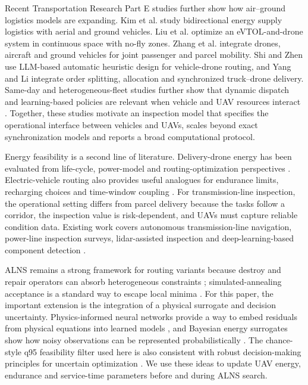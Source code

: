 \documentclass[preprint,12pt,number]{elsarticle}
\newcommand{\rev}[1]{{\color{blue}#1}}
\begin{document}
Recent Transportation Research Part E studies further show how air--ground logistics models are expanding. Kim et al. \cite{kim2026bidirectional} study bidirectional energy supply logistics with aerial and ground vehicles. Liu et al. \cite{liu2026evtol} optimize an eVTOL-and-drone system in continuous space with no-fly zones. Zhang et al. \cite{zhang2026airground} integrate drones, aircraft and ground vehicles for joint passenger and parcel mobility. Shi and Zhen \cite{shi2026llm} use LLM-based automatic heuristic design for vehicle-drone routing, and Yang and Li \cite{yang2025integrated} integrate order splitting, allocation and synchronized truck--drone delivery. Same-day and heterogeneous-fleet studies further show that dynamic dispatch and learning-based policies are relevant when vehicle and UAV resources interact \cite{ulmer2018sameday,chen2022deepq}. \rev{Together, these studies motivate an inspection model that specifies the operational interface between vehicles and UAVs, scales beyond exact synchronization models and reports a broad computational protocol.}

Energy feasibility is a second line of literature. Delivery-drone energy has been evaluated from life-cycle, power-model and routing-optimization perspectives \cite{stolaroff2018energy,zhang2021energyconsumption,aiello2021energy,chiang2019sustainability,cokyasar2023regional}. Electric-vehicle routing also provides useful analogues for endurance limits, recharging choices and time-window coupling \cite{schneider2014evrptw,desaulniers2016evrp}. For transmission-line inspection, the operational setting differs from parcel delivery because the tasks follow a corridor, the inspection value is risk-dependent, and UAVs must capture reliable condition data. Existing work covers autonomous transmission-line navigation, power-line inspection surveys, lidar-assisted inspection and deep-learning-based component detection \cite{hui2019monocular,ahmed2024powerline,li2021uavtransmission,nguyen2018visionreview,liu2021uavlidar,zhang2020visualinspection,li2025deeppowerline}.

ALNS remains a strong framework for routing variants because destroy and repair operators can absorb heterogeneous constraints \cite{ropke2006alns,sacramento2019alns}; simulated-annealing acceptance is a standard way to escape local minima \cite{kirkpatrick1983annealing}. For this paper, the important extension is the integration of a physical surrogate and decision uncertainty. Physics-informed neural networks provide a way to embed residuals from physical equations into learned models \cite{raissi2019pinn,karniadakis2021piml,lu2021deepxde,cuomo2022pinnreview}, and Bayesian energy surrogates show how noisy observations can be represented probabilistically \cite{yang2021bpinn}. The chance-style q95 feasibility filter used here is also consistent with robust decision-making principles for uncertain optimization \cite{bertsimas2004robustness}. We use these ideas to update UAV energy, endurance and service-time parameters before and during ALNS search.
\end{document}
